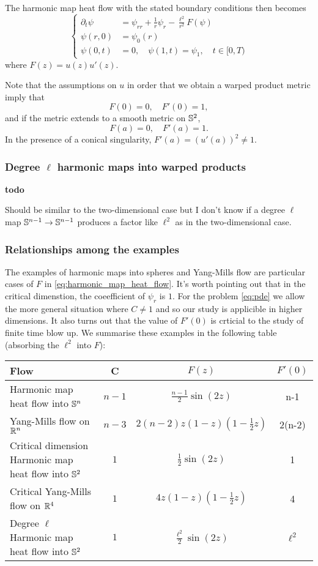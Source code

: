 \documentclass{amsart}
\begin{document}
The harmonic map heat flow with the stated boundary conditions then becomes
\begin{equation}
\label{eq:harmonic_map_heat_flow}
\begin{cases}
\partial_t \psi &= \psi_{rr} + \frac{1}{r} \psi_r - \frac{\ell^2}{r^2} F(\psi) \\
\psi(r, 0) &= \psi_0(r) \\
\psi(0, t) &= 0, \quad \psi(1, t) = \psi_1, \quad t \in [0, T)
\end{cases}
\end{equation}
where \(F(z) = u(z)u'(z)\).

Note that the assumptions on \(u\) in order that we obtain a warped product metric imply that
\[
F(0) = 0, \quad F'(0) = 1,
\]
and if the metric extends to a smooth metric on \(\S^2\),
\[
F(a) = 0, \quad F'(a) = 1.
\]
In the presence of a conical singularity, \(F'(a) = (u'(a))^2 \ne 1\).

\subsubsection*{Degree \(\ell\) harmonic maps into warped products}

\textbf{todo}

Should be similar to the two-dimensional case but I don't know if a degree \(\ell\) map \(\S^{n-1} \to \S^{n-1}\) produces a factor like \(\ell^2\) as in the two-dimensional case.

\subsubsection*{Relationships among the examples}

The examples of harmonic maps into spheres and Yang-Mills flow are particular cases of \(F\) in \eqref{eq:harmonic_map_heat_flow}. It's worth pointing out that in the critical dimenstion, the coeefficient of \(\psi_r\) is \(1\). For the problem \eqref{eq:pde} we allow the more general situation where \(C \ne 1\) and so our study is applicible in higher dimensions. It also turns out that the value of \(F'(0)\) is crticial to the study of finite time blow up. We summarise these examples in the following table (absorbing the \(\ell^2\) into \(F\)):

\begin{center}
\begin{tabular}{ l | c | c | c}
Flow & C & \(F(z)\) & \(F'(0)\) \\
\hline
Harmonic map heat flow into \(\S^n\) & \(n-1\) & \(\tfrac{n-1}{2} \sin(2z)\) & n-1 \\
Yang-Mills flow on \(\R^n\) & \(n-3\) & \(2(n-2) z(1 - z)(1 - \tfrac{1}{2} z)\) & 2(n-2) \\
Critical dimension Harmonic map heat flow into \(\S^2\) & \(1\) & \(\tfrac{1}{2} \sin(2z)\) & 1 \\
Critical Yang-Mills flow on \(\R^4\) & \(1\) & \(4 z(1 - z)(1 - \tfrac{1}{2} z)\) & 4 \\
Degree \(\ell\) Harmonic map heat flow into \(\S^2\) & \(1\) & \(\tfrac{\ell^2}{2} \sin(2z)\) & \(\ell^2\)
\end{tabular}
\end{center}
\end{document}
